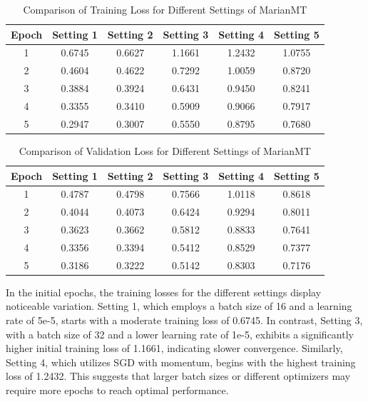 \documentclass{article}
\begin{document}
\begin{table}[H]
\centering
\begin{tabular}{|c|c|c|c|c|c|}
\hline
\textbf{Epoch} & \textbf{Setting 1} & \textbf{Setting 2} & \textbf{Setting 3} & \textbf{Setting 4} & \textbf{Setting 5} \\
\hline
1 & 0.6745 & 0.6627 & 1.1661 & 1.2432 & 1.0755 \\
2 & 0.4604 & 0.4622 & 0.7292 & 1.0059 & 0.8720 \\
3 & 0.3884 & 0.3924 & 0.6431 & 0.9450 & 0.8241 \\
4 & 0.3355 & 0.3410 & 0.5909 & 0.9066 & 0.7917 \\
5 & 0.2947 & 0.3007 & 0.5550 & 0.8795 & 0.7680 \\
\hline
\end{tabular}
\caption{Comparison of Training Loss for Different Settings of MarianMT}
\end{table}

\begin{table}[H]
\centering
\begin{tabular}{|c|c|c|c|c|c|}
\hline
\textbf{Epoch} & \textbf{Setting 1} & \textbf{Setting 2} & \textbf{Setting 3} & \textbf{Setting 4} & \textbf{Setting 5} \\
\hline
1 & 0.4787 & 0.4798 & 0.7566 & 1.0118 & 0.8618 \\
2 & 0.4044 & 0.4073 & 0.6424 & 0.9294 & 0.8011 \\
3 & 0.3623 & 0.3662 & 0.5812 & 0.8833 & 0.7641 \\
4 & 0.3356 & 0.3394 & 0.5412 & 0.8529 & 0.7377 \\
5 & 0.3186 & 0.3222 & 0.5142 & 0.8303 & 0.7176 \\
\hline
\end{tabular}
\caption{Comparison of Validation Loss for Different Settings of MarianMT}
\end{table}
In the initial epochs, the training losses for the different settings display noticeable variation. Setting 1, which employs a batch size of 16 and a learning rate of 5e-5, starts with a moderate training loss of 0.6745. In contrast, Setting 3, with a batch size of 32 and a lower learning rate of 1e-5, exhibits a significantly higher initial training loss of 1.1661, indicating slower convergence. Similarly, Setting 4, which utilizes SGD with momentum, begins with the highest training loss of 1.2432. This suggests that larger batch sizes or different optimizers may require more epochs to reach optimal performance.
\end{document}
